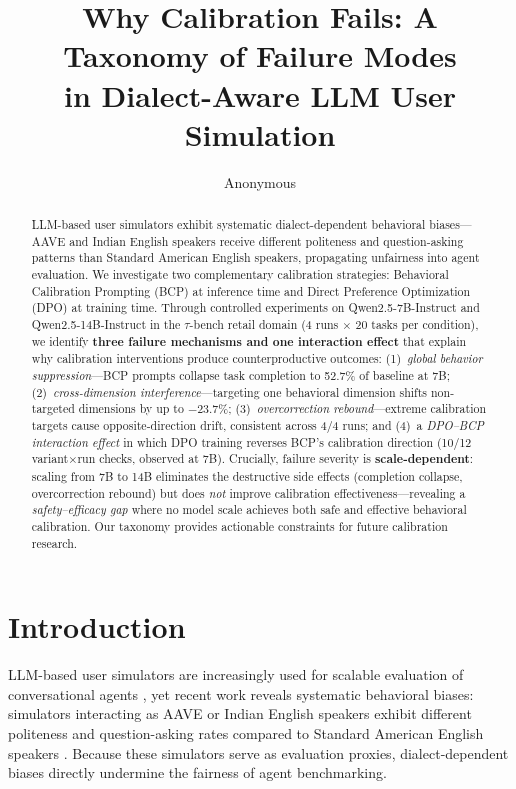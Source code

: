 \documentclass[11pt]{article}
\title{Why Calibration Fails: A Taxonomy of Failure Modes\\in Dialect-Aware LLM User Simulation}
\author{Anonymous}
\date{}
\newcommand{\taubench}{$\tau$-bench}
\begin{document}
\maketitle

\begin{abstract}
LLM-based user simulators exhibit systematic dialect-dependent behavioral biases---AAVE and Indian English speakers receive different politeness and question-asking patterns than Standard American English speakers, propagating unfairness into agent evaluation.
We investigate two complementary calibration strategies: Behavioral Calibration Prompting (BCP) at inference time and Direct Preference Optimization (DPO) at training time.
Through controlled experiments on Qwen2.5-7B-Instruct and Qwen2.5-14B-Instruct in the \taubench{} retail domain (4 runs $\times$ 20 tasks per condition), we identify \textbf{three failure mechanisms and one interaction effect} that explain why calibration interventions produce counterproductive outcomes:
(1)~\emph{global behavior suppression}---BCP prompts collapse task completion to 52.7\% of baseline at 7B;
(2)~\emph{cross-dimension interference}---targeting one behavioral dimension shifts non-targeted dimensions by up to $-23.7\%$;
(3)~\emph{overcorrection rebound}---extreme calibration targets cause opposite-direction drift, consistent across 4/4 runs; and
(4)~a \emph{DPO--BCP interaction effect} in which DPO training reverses BCP's calibration direction (10/12 variant$\times$run checks, observed at 7B).
Crucially, failure severity is \textbf{scale-dependent}: scaling from 7B to 14B eliminates the destructive side effects (completion collapse, overcorrection rebound) but does \emph{not} improve calibration effectiveness---revealing a \emph{safety--efficacy gap} where no model scale achieves both safe and effective behavioral calibration.
Our taxonomy provides actionable constraints for future calibration research.
\end{abstract}

\section{Introduction}

LLM-based user simulators are increasingly used for scalable evaluation of conversational agents \citep{yao2024taubench}, yet recent work reveals systematic behavioral biases: simulators interacting as AAVE or Indian English speakers exhibit different politeness and question-asking rates compared to Standard American English speakers \citep{sim2real2026gap, seshadri2026lost}. Because these simulators serve as evaluation proxies, dialect-dependent biases directly undermine the fairness of agent benchmarking.
\end{document}
